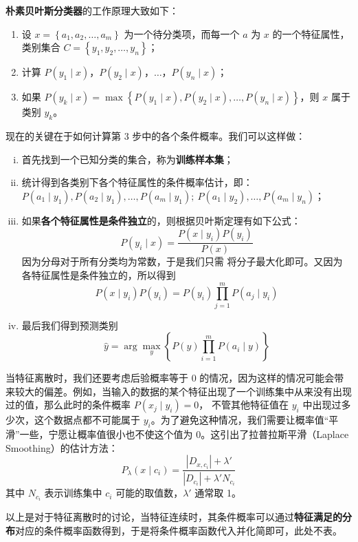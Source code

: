 \documentclass[a4paper, 11pt, cn]{elegantpaper}
\begin{document}
\textbf{朴素贝叶斯分类器}的工作原理大致如下：
\begin{enumerate}
    \item 设 $x = \left\{a_1, a_2, \dots, a_m\right\}$ 为一个待分类项，而每一个 $a$ 为 $x$ 的一个特征属性，类别集合 $C = \left\{y_1, y_2, \dots, y_n\right\}$；
    \item 计算 $P\left(y_1 \mid x\right)$，$P\left(y_2 \mid x\right)$，$\dots$，$P\left(y_n \mid x\right)$；
    \item 如果 $P\left(y_k \mid x\right) = \max\left\{P\left(y_1 \mid x\right), P\left(y_2 \mid x\right), \dots, P\left(y_n \mid x\right)\right\}$，则 $x$ 属于类别 $y_k$。
\end{enumerate}

现在的关键在于如何计算第 3 步中的各个条件概率。我们可以这样做：
\begin{enumerate}[(i)]
    \item 首先找到一个已知分类的集合，称为\textbf{训练样本集}；
    \item 统计得到各类别下各个特征属性的条件概率估计，即：$P(a_1 \mid y_1), P(a_2 \mid y_1), \dots, P(a_m \mid y_1);\ P(a_1 \mid y_2), \dots, P(a_m \mid y_n)$；
    \item 如果\textbf{各个特征属性是条件独立}的，则根据贝叶斯定理有如下公式：$$P(y_i \mid x) = \dfrac{P(x \mid y_i)P(y_i)}{P(x)}$$ 因为分母对于所有分类均为常数，于是我们只需
将分子最大化即可。又因为各特征属性是条件独立的，所以得到 $$P(x \mid y_i)P(y_i) = P(y_i)\prod\limits_{j=1}^mP(a_j \mid y_i)$$
    \item 最后我们得到预测类别 $$\hat{y} = \arg\max_y\left\{P(y)\prod\limits_{i = 1}^mP(a_i \mid y)\right\}$$
\end{enumerate}

当特征离散时，我们还要考虑后验概率等于 0 的情况，因为这样的情况可能会带来较大的偏差。例如，当输入的数据的某个特征出现了一个训练集中从来没有出现过的值，那么此时的条件概率 $P(x_j \mid y_i) = 0$，
不管其他特征值在 $y_i$ 中出现过多少次，这个数据点都不可能属于 $y_i$。为了避免这种情况，我们需要让概率值“平滑”一些，宁愿让概率值很小也不使这个值为 0。这引出了拉普拉斯平滑（Laplace Smoothing）的估计方法：
$$P_\lambda(x \mid c_i) = \dfrac{|D_{x, c_i}| + \lambda'}{|D_{c_i}| + \lambda'N_{c_i}}$$ 其中 $N_{c_i}$ 表示训练集中 $c_i$ 可能的取值数，$\lambda'$ 通常取 1。

以上是对于特征离散时的讨论，当特征连续时，其条件概率可以通过\textbf{特征满足的分布}对应的条件概率函数得到，于是将条件概率函数代入并化简即可，此处不表。
\end{document}
